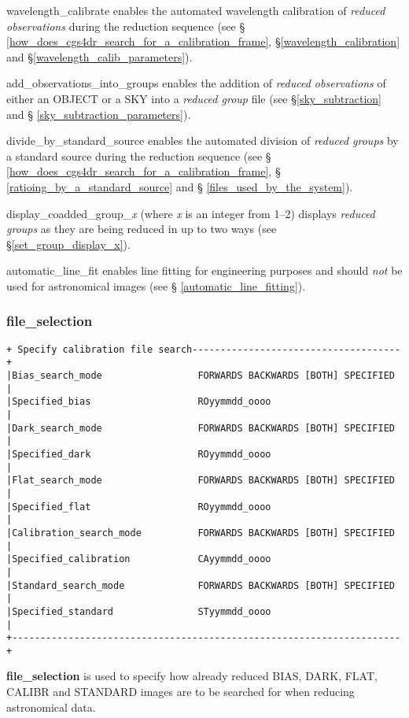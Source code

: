 {{\sf wavelength\_calibrate} enables the automated wavelength calibration of
{\em reduced observations} during the reduction sequence (see \S
\ref{how_does_cgs4dr_search_for_a_calibration_frame}, 
\S \ref{wavelength_calibration} and \S \ref{wavelength_calib_parameters}).

{\sf add\_observations\_into\_groups} enables the addition of {\em reduced 
observations} of either an {\sf OBJECT} or a {\sf SKY} into a {\em reduced 
group} file (see \S \ref{sky_subtraction} and \S 
\ref{sky_subtraction_parameters}).

{\sf divide\_by\_standard\_source} enables the automated division of {\em
reduced groups} by a standard source during the reduction sequence (see \S 
\ref{how_does_cgs4dr_search_for_a_calibration_frame}, \S 
\ref{ratioing_by_a_standard_source} and \S
\ref{files_used_by_the_system}).

{\sf display\_coadded\_group\_{\em x}} (where {\em x} is an integer from 1--2)
displays {\em reduced groups} as they are being reduced in up to two ways 
(see \S \ref{set_group_display_x}).

{\sf automatic\_line\_fit} enables line fitting for engineering purposes
and should {\em not} be used for astronomical images (see \S 
\ref{automatic_line_fitting}).

\subsubsection{file\_selection}
\label{file_selection}
\begin{verbatim}
+ Specify calibration file search-------------------------------------+
|Bias_search_mode                 FORWARDS BACKWARDS [BOTH] SPECIFIED |
|Specified_bias                   ROyymmdd_oooo                       |
|Dark_search_mode                 FORWARDS BACKWARDS [BOTH] SPECIFIED |
|Specified_dark                   ROyymmdd_oooo                       |
|Flat_search_mode                 FORWARDS BACKWARDS [BOTH] SPECIFIED |
|Specified_flat                   ROyymmdd_oooo                       |
|Calibration_search_mode          FORWARDS BACKWARDS [BOTH] SPECIFIED |
|Specified_calibration            CAyymmdd_oooo                       |
|Standard_search_mode             FORWARDS BACKWARDS [BOTH] SPECIFIED |
|Specified_standard               STyymmdd_oooo                       |
+---------------------------------------------------------------------+
\end{verbatim}

{\bf file\_selection} is used to specify how already reduced {\sf BIAS}, 
{\sf DARK}, {\sf FLAT}, {\sf CALIBR} and {\sf STANDARD} images are to 
be searched for when reducing astronomical data.

}
